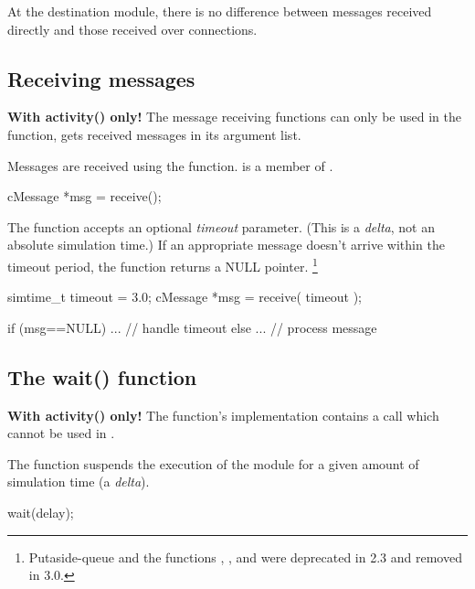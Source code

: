 At the destination module, there is no difference between messages received
directly and those received over connections.



\subsection{Receiving messages}
\label{sec:simple-modules:receiving-messages}

\textbf{With activity() only!} The message receiving functions can
only be used in the  function,
 gets received messages in its argument list.

Messages are received using the  function.
 is a member of .

\begin{cpp}
cMessage *msg = receive();
\end{cpp}

The  function accepts an optional \textit{timeout}
parameter. (This is a \textit{delta}, not an
absolute simulation time.) If an appropriate message doesn't arrive
within the timeout period, the function returns a NULL pointer.
    \footnote{Putaside-queue and the functions ,
    , and  were deprecated
    in {\opp} 2.3 and removed in {\opp} 3.0.}

\begin{cpp}
simtime_t timeout = 3.0;
cMessage *msg = receive( timeout );

if (msg==NULL)
{
    ...   // handle timeout
}
else
{
    ...  // process message
}
\end{cpp}



\subsection{The wait() function}
\label{sec:simple-modules:wait}

\textbf{With activity() only!} The  function's implementation
contains a  call which cannot be used in .

The  function suspends the execution of the module for
a given amount of simulation time (a \textit{delta}).

\begin{cpp}
wait(delay);
\end{cpp}

